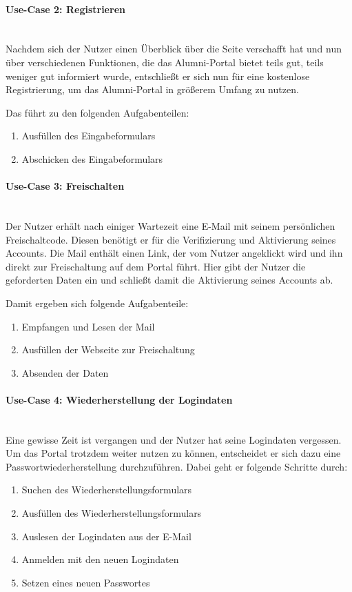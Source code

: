\paragraph{Use-Case 2: Registrieren}\quad\\
Nachdem sich der Nutzer einen Überblick über die Seite verschafft hat und nun über verschiedenen Funktionen, die das Alumni-Portal bietet teils gut, teils weniger gut informiert wurde, entschließt er sich nun für eine kostenlose Registrierung, um das Alumni-Portal in größerem Umfang zu nutzen.

Das führt zu den folgenden Aufgabenteilen:
\begin{enumerate}
		\item Ausfüllen des Eingabeformulars
		\item Abschicken des Eingabeformulars
\end{enumerate}

\paragraph{Use-Case 3: Freischalten}\quad\\
Der Nutzer erhält nach einiger Wartezeit eine E\hbox{-}Mail mit seinem persönlichen Freischaltcode. Diesen benötigt er für die Verifizierung und Aktivierung seines Accounts. Die Mail enthält einen Link, der vom Nutzer angeklickt wird und ihn direkt zur Freischaltung auf dem Portal führt. Hier gibt der Nutzer die geforderten Daten ein und schließt damit die Aktivierung seines Accounts ab.

Damit ergeben sich folgende Aufgabenteile:
\begin{enumerate}
		\item Empfangen und Lesen der Mail
		\item Ausfüllen der Webseite zur Freischaltung
		\item Absenden der Daten
\end{enumerate}


\paragraph{Use-Case 4: Wiederherstellung der Logindaten}\quad\\
Eine gewisse Zeit ist vergangen und der Nutzer hat seine Logindaten vergessen. Um das Portal trotzdem weiter nutzen zu können, entscheidet er sich dazu eine Passwortwiederherstellung durchzuführen. 
Dabei geht er folgende Schritte durch:
\begin{enumerate}
\item Suchen des Wiederherstellungsformulars
\item Ausfüllen des Wiederherstellungsformulars
\item Auslesen der Logindaten aus der E-Mail
\item Anmelden mit den neuen Logindaten
\item Setzen eines neuen Passwortes
\end{enumerate}


